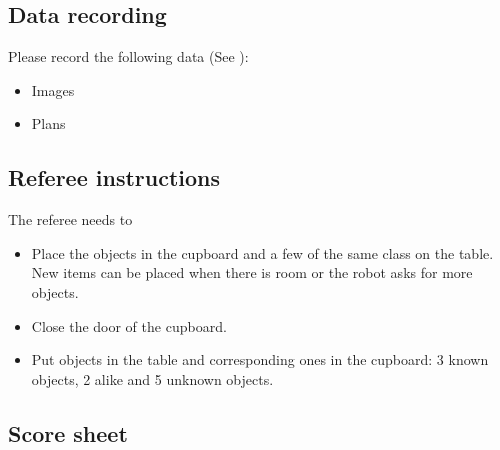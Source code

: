 \subsection{Data recording}
  Please record the following data (See ):
  \begin{itemize}
   \item Images
   \item Plans
  \end{itemize}

\subsection{Referee instructions}

The referee needs to
\begin{itemize}
\item Place the objects in the cupboard and a few of the same class on the table. New items can be placed when there is room or the robot asks for more objects. 
\item Close the door of the cupboard. 
\item Put objects in the table and corresponding ones in the cupboard: 3 known objects, 2 alike and 5 unknown objects. 
\end{itemize}

\subsection{Score sheet}



